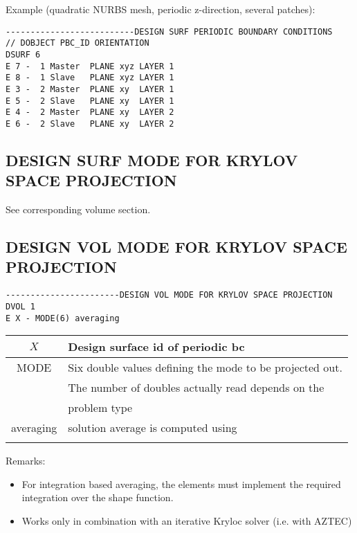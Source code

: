 Example (quadratic NURBS mesh, periodic z-direction, several patches):

\begin{verbatim}
--------------------------DESIGN SURF PERIODIC BOUNDARY CONDITIONS
// DOBJECT PBC_ID ORIENTATION
DSURF 6
E 7 -  1 Master  PLANE xyz LAYER 1
E 8 -  1 Slave   PLANE xyz LAYER 1
E 3 -  2 Master  PLANE xy  LAYER 1
E 5 -  2 Slave   PLANE xy  LAYER 1
E 4 -  2 Master  PLANE xy  LAYER 2
E 6 -  2 Slave   PLANE xy  LAYER 2
\end{verbatim}

\subsection{DESIGN SURF MODE FOR KRYLOV SPACE PROJECTION}
See corresponding volume section.

\subsection{DESIGN VOL MODE FOR KRYLOV SPACE PROJECTION}

\begin{verbatim}
-----------------------DESIGN VOL MODE FOR KRYLOV SPACE PROJECTION
DVOL 1
E X - MODE(6) averaging
\end{verbatim}

\begin{center}
\begin{tabular}{c||l}
$X$            & Design surface id of periodic bc                        \\ \hline
MODE           & Six double values defining the mode to be projected out.\\
               & The number of doubles actually read depends on the      \\ 
               & problem type                                            \\ \hline
averaging      & solution average is computed using \verb1integration1 or\\
               & \verb1pointvalues1                                      \\
\end{tabular}
\end{center}

Remarks:
\begin{itemize}
\item For integration based averaging, the elements must implement the
required integration over the shape function.
\item Works only in combination with an iterative Kryloc solver (i.e. with AZTEC)
\end{itemize}

